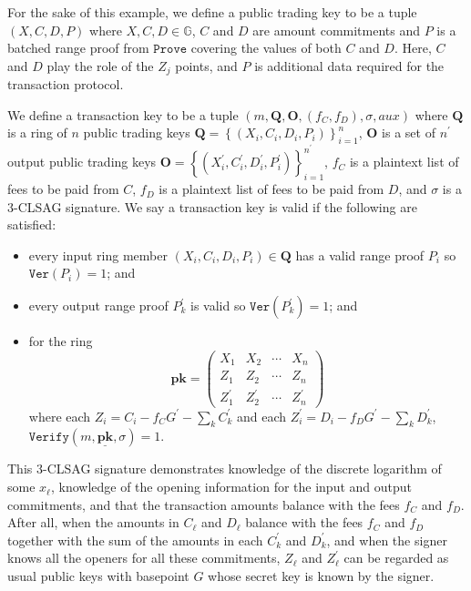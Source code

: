 \documentclass{mrl}
\theoremstyle{plain}
\theoremstyle{definition}
\begin{document}
For the sake of this example, we define a public trading key to be a tuple $(X, C, D, P)$ where $X, C, D \in \mathbb{G}$, $C$ and $D$ are amount commitments and $P$ is a batched range proof from $\texttt{Prove}$ covering the values of both $C$ and $D$. Here, $C$ and $D$ play the role of the $Z_j$ points, and $P$ is additional data required for the transaction protocol.

We define a transaction key to be a tuple $(m, \textbf{Q}, \textbf{O}, (f_C, f_D), \sigma, \textit{aux})$ where $\textbf{Q}$ is a ring of $n$ public trading keys  $\textbf{Q} = \left\{(X_i, C_i, D_i, P_i)\right\}_{i=1}^{n}$, $\textbf{O}$ is a set of $n^\prime$ output public trading keys $\textbf{O} = \left\{(X_i^\prime, C_i^\prime, D_i^\prime, P_i^\prime)\right\}_{i=1}^{n^\prime}$, $f_C$ is a plaintext list of fees to be paid from $C$, $f_D$ is a plaintext list of fees to be paid from $D$, and $\sigma$ is a $3$-CLSAG signature. We say a transaction key is valid if the following are satisfied:
\begin{itemize}
\item every input ring member $(X_i, C_i, D_i, P_i) \in \textbf{Q}$ has a valid range proof $P_i$ so $\texttt{Ver}(P_i) = 1$; and
\item every output range proof $P_k^\prime$ is valid so $\texttt{Ver}(P_k^\prime)=1$; and
\item for the ring \[\textbf{pk} = \begin{pmatrix} X_1 & X_2 & \cdots & X_n \\ Z_1 & Z_2 & \cdots & Z_n \\ Z_1^\prime & Z_2^\prime & \cdots & Z_n^\prime\end{pmatrix}\] where each $Z_i = C_i - f_C G^\prime - \sum_k C_k^\prime$ and each $Z_i^\prime = D_i - f_D G^\prime - \sum_k D_k^\prime$,  $\texttt{Verify}(m, \underline{\textbf{pk}}, \sigma) = 1$.
\end{itemize}

This $3$-CLSAG signature demonstrates knowledge of the discrete logarithm of some $x_\ell$, knowledge of the opening information for the input and output commitments, and that the transaction amounts balance  with the fees $f_C$ and $f_D$.  After all, when the amounts in $C_\ell$ and $D_\ell$ balance with the fees $f_C$ and $f_D$ together with the sum of the amounts in each $C_k^\prime$ and $D_k^\prime$, and when the signer knows all the openers for all these commitments, $Z_\ell$ and $Z_\ell^\prime$ can be regarded as usual public keys with basepoint $G$ whose secret key is known by the signer.
\end{document}
